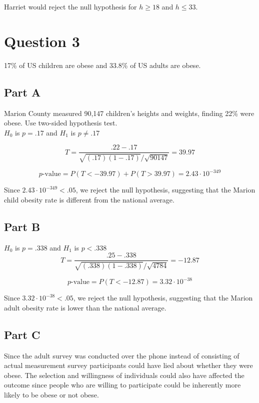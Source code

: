 \documentclass[letterpaper]{article}
\begin{document}
\noindent Harriet would reject the null hypothesis for $h \geq 18$ and $h \leq 33$.

\newpage

\section*{Question 3}

17\% of US children are obese and 33.8\% of US adults are obese.

\subsection*{Part A}

Marion County measured 90,147 children's heights and weights, finding 22\% were obese. Use two-sided hypothesis test.\\

$H_0$ is $p = .17$ and $H_1$ is $p \neq .17$

$$T = \frac{.22 - .17}{\sqrt{(.17)(1 - .17)} / \sqrt{90147}} = 39.97$$

$$p\text{-value} = P(T < -39.97) + P(T > 39.97) = 2.43 \cdot 10^{-349}$$

\noindent Since $2.43 \cdot 10^{-349} < .05$, we reject the null hypothesis, suggesting that the Marion child obesity rate is different from the national average.

\subsection*{Part B}

$H_0$ is $p = .338$ and $H_1$ is $p < .338$\\

$$T = \frac{.25 - .338}{\sqrt{(.338)(1 - .338)} / \sqrt{4784}} = -12.87$$

$$p\text{-value} = P(T < -12.87) = 3.32 \cdot 10^{-38}$$

\noindent Since $3.32 \cdot 10^{-38} < .05$, we reject the null hypothesis, suggesting that the Marion adult obesity rate is lower than the national average.

\subsection*{Part C}

Since the adult survey was conducted over the phone instead of consisting of actual measurement survey participants could have lied about whether they were obese. The selection and willingness of individuals could also have affected the outcome since people who are willing to participate could be inherently more likely to be obese or not obese.
\end{document}
